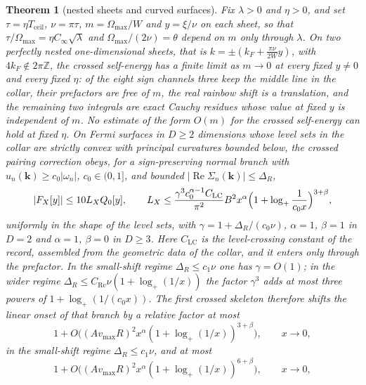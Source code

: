 \documentclass[aps,10pt,superscriptaddress,floatfix,amsmath,amssymb,nofootinbib]{revtex4-2}
\newcommand{\Cinf}{C_\infty}
\newcommand{\CLC}{C_{\mathrm{LC}}}
\newcommand{\Tceil}{T_{\mathrm{ceil}}}
\newtheorem{theorem}{Theorem}
\begin{document}
\begin{theorem}[nested sheets and curved surfaces]\label{thm:dichotomy}
Fix $\lambda>0$ and $\eta>0$, and set $\tau=\eta\Tceil$, $\nu=\pi\tau$,
$m=\Omega_{\max}/W$ and $y=\xi/\nu$ on each sheet, so that
$\tau/\Omega_{\max}=\eta\Cinf\sqrt\lambda$ and $\Omega_{\max}/(2\nu)=\theta$ depend on $m$
only through $\lambda$. On two perfectly nested one-dimensional sheets, that is
$k=\pm(k_F+\frac{\pi\nu}{2W}y)$, with $4k_F\notin2\pi\mathbb{Z}$, the crossed self-energy has
a finite limit as $m\to0$ at every fixed $y\ne0$ and every fixed $\eta$: of the eight sign
channels three keep the middle line in the collar, their prefactors are free of $m$, the
real rainbow shift is a translation, and the remaining two integrals are exact Cauchy
residues whose value at fixed $y$ is independent of $m$. No estimate of the form $O(m)$ for
the crossed self-energy can hold at fixed $\eta$. On Fermi surfaces in $D\ge2$ dimensions
whose level sets in the collar are strictly convex with principal curvatures bounded below,
the crossed pairing correction obeys, for a sign-preserving normal branch with
$u_n(\mathbf k)\ge c_0|\omega_n|$, $c_0\in(0,1]$, and bounded
$|\operatorname{Re}\Sigma_n(\mathbf k)|\le\Delta_R$,
\begin{equation}\label{eq:coarea}
|F_X[y]|\le10L_XQ_0[y],\qquad
L_X\le\frac{\gamma^{3}c_0^{\alpha-1}\CLC}{\pi^{2}}B^{2}x^{\alpha}
\Bigl(1+\log_+\frac{1}{c_0x}\Bigr)^{3+\beta},
\end{equation}
uniformly in the shape of the level sets, with $\gamma=1+\Delta_R/(c_0\nu)$,
$\alpha=1$, $\beta=1$ in $D=2$ and $\alpha=1$, $\beta=0$ in $D\ge3$. Here $\CLC$ is the
level-crossing constant of the record, assembled from the geometric data of the collar, and
it enters only through the prefactor. In the small-shift regime $\Delta_R\le c_1\nu$ one has
$\gamma=O(1)$; in the wider regime $\Delta_R\le C_{\mathrm{Re}}\nu(1+\log_+(1/x))$ the factor
$\gamma^{3}$ adds at most three powers of $1+\log_+(1/(c_0x))$. The first crossed skeleton
therefore shifts the linear onset of that branch by a relative factor at most
\begin{equation}\label{eq:shift}
1+O\bigl((A v_{\max}R)^{2}x^{\alpha}(1+\log_+(1/x))^{3+\beta}\bigr),\qquad x\to0,
\end{equation}
in the small-shift regime $\Delta_R\le c_1\nu$, and at most
\begin{equation}\label{eq:shiftwide}
1+O\bigl((A v_{\max}R)^{2}x^{\alpha}(1+\log_+(1/x))^{6+\beta}\bigr),\qquad x\to0,
\end{equation}

\end{theorem}
\end{document}
